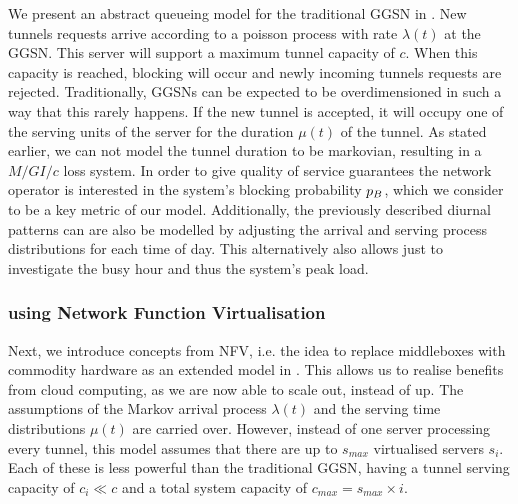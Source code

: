 We present an abstract queueing model for the traditional \gls{GGSN} in .
New tunnels requests arrive according to a poisson process with rate \(\lambda(t)\) at the \gls{GGSN}.
This server will support a maximum tunnel capacity of \(c\).
When this capacity is reached, blocking will occur and newly incoming tunnels requests are rejected.
Traditionally, \glspl{GGSN} can be expected to be overdimensioned in such a way that this rarely happens.
If the new tunnel is accepted, it will occupy one of the serving units of the server for the duration \(\mu(t)\) of the tunnel.
As stated earlier, we can not model the tunnel duration to be markovian, resulting in a  \(M/GI/c\) loss system.
In order to give quality of service guarantees the network operator is interested in the system's blocking probability \(p_B\), which we consider to be a key metric of our model.
Additionally, the previously described diurnal patterns can are also be modelled by adjusting the arrival and serving process distributions for each time of day.
This alternatively also allows just to investigate the busy hour and thus the system's peak load.

\subsubsection*{ using Network Function Virtualisation}\label{sec:cloud:virtualized_network_functions:model:virtual_ggsn}
Next, we introduce concepts from \gls{NFV}, i.e. the idea to replace middleboxes with commodity hardware as an extended model in . 
This allows us to realise benefits from cloud computing, as we are now able to scale out, instead of up.
The assumptions of the Markov arrival process \(\lambda(t)\) and the serving time distributions \(\mu(t)\) are carried over.
However, instead of one server processing every tunnel, this model assumes that there are up to \(s_{max}\) virtualised servers \(s_i\).
Each of these is less powerful than the traditional \gls{GGSN}, having a tunnel serving capacity of \(c_i \ll c\) and a total system capacity of \(c_{max} = s_{max} \times i\).


